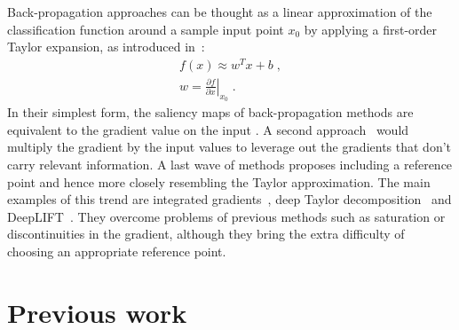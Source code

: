 \documentclass{article}
\begin{document}
Back-propagation approaches can be thought as a linear approximation of the classification function around a sample input point $x_0$ by applying a first-order Taylor expansion, as introduced in~\cite{Simonyan2014}:
\begin{align}
f(x) \approx w^T x + b \; , \\
w = \left. \frac{\partial f}{\partial x} \right|_{x_0} \; .
\end{align}
In their simplest form, the saliency maps of back-propagation methods are equivalent to the gradient value on the input \cite{Simonyan2014}. A second approach~\cite{Bach2015} would multiply the gradient by the input values to leverage out the gradients that don't carry relevant information. A last wave of methods proposes including a reference point and hence more closely resembling the Taylor approximation. The main examples of this trend are integrated gradients~\cite{Sundararajan2017}, deep Taylor decomposition~\cite{Montavon2017} and DeepLIFT~\cite{Shrikumar2017}. They overcome problems of previous methods such as saturation or discontinuities in the gradient, although they bring the extra difficulty of choosing an appropriate reference point.

\section{Previous work}
\label{sec:prevwork}

%
\end{document}
